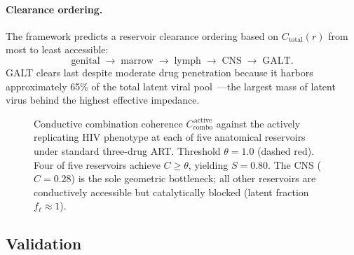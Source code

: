 \documentclass[11pt]{article}
\theoremstyle{plain}
\theoremstyle{definition}
\newcommand{\Ccombo}{C_{\mathrm{combo}}}
\begin{document}
\paragraph{Clearance ordering.}
The framework predicts a reservoir clearance ordering based on
$C_{\mathrm{total}}(r)$ from most to least accessible:
\[
  \text{genital} \;\to\; \text{marrow} \;\to\;
  \text{lymph} \;\to\; \text{CNS} \;\to\; \text{GALT}.
\]
GALT clears last despite moderate drug penetration because it
harbors approximately 65\% of the total latent viral
pool~\cite{Chun2008}---the largest mass of latent virus behind
the highest effective impedance.

\begin{figure}[t]
\centering
{}
\caption{Conductive combination coherence
$\Ccombo^{\,\mathrm{active}}$ against the actively replicating
HIV phenotype at each of five anatomical reservoirs under standard
three-drug ART. Threshold $\theta = 1.0$ (dashed red).
Four of five reservoirs achieve $C \geq \theta$, yielding
$S = 0.80$. The CNS ($C = 0.28$) is the sole geometric
bottleneck; all other reservoirs are conductively accessible but
catalytically blocked (latent fraction $f_\ell \approx 1$).}
\label{fig:hiv-landscape}
\end{figure}

\subsection{Validation}
\label{sec:hiv-validation}
\end{document}
